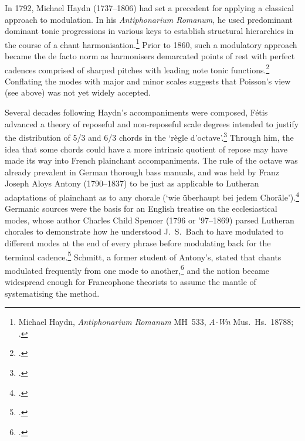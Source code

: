 In 1792, Michael Haydn (1737--1806) had set a precedent for applying a classical approach to modulation.
In his \emph{Antiphonarium Romanum}, he used predominant \rightarrow{} dominant \rightarrow{} tonic progressions in various keys to establish structural hierarchies in the course of a chant harmonisation.\footnote{Michael Haydn, \emph{Antiphonarium Romanum} MH~533, \emph{A-Wn} Mus.~Hs.~18788; \cite[116]{WagenerBegleitunggregorianischenChorals1964}.}
Prior to 1860, such a modulatory approach became the de facto norm as harmonisers demarcated points of rest with perfect cadences comprised of sharped pitches with leading note \rightarrow{} tonic functions.\footcite[34]{JailletMethodenouvellepour1857}
Conflating the modes with major and minor scales suggests that Poisson's view (see  above) was not yet widely accepted.
\noclub[2]

Several decades following Haydn's accompaniments were composed, Fétis advanced a theory of reposeful and non-reposeful scale degrees intended to justify the distribution of 5/3 and 6/3 chords in the `règle d'octave'.\footcites[9]{FetisMethodeelementaireabregee1824}[Described in][121]{SimmsChoronFetisTheory1975}
Through him, the idea that some chords could have a more intrinsic quotient of repose may have made its way into French plainchant accompaniments.
The rule of the octave was already prevalent in German thorough bass manuals, and was held by Franz Joseph Aloys Antony (1790--1837) to be just as applicable to Lutheran adaptations of plainchant as to any chorale (`wie überhaupt bei jedem Choräle').\footcite[57]{AntonyArchaeologischliturgischesLehrbuchgregorianischen1829}
%
Germanic sources were the basis for an English treatise on the ecclesiastical modes, whose author Charles Child Spencer (1796 or '97--1869) parsed Lutheran chorales to demonstrate how he understood J.~S.~Bach to have modulated to different modes at the end of every phrase before modulating back for the terminal cadence.\footcite[37]{SpencerConciseExplanationChurch1846}
Schmitt, a former student of Antony's, stated that chants modulated frequently from one mode to another,\footcite[23]{SchmittMethodeelementaireharmonisation1857} and the notion became widespread enough for Francophone theorists to assume the mantle of systematising the method.

